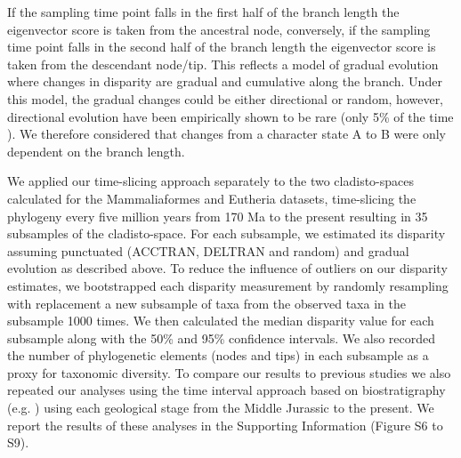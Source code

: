 \documentclass[10pt,letterpaper]{article}
\begin{document}
\begin{enumerate}
    If the sampling time point falls in the first half of the branch length the eigenvector score is taken from the ancestral node, conversely, if the sampling time point falls in the second half of the branch length the eigenvector score is taken from the descendant node/tip.
    This reflects a model of gradual evolution where changes in disparity are gradual and cumulative along the branch.
    Under this model, the gradual changes could be either directional or random, however, directional evolution have been empirically shown to be rare (only 5\% of the time \cite{Hunt20112007}).
    We therefore considered that changes from a character state A to B were only dependent on the branch length.
\end{enumerate}
We applied our time-slicing approach separately to the two cladisto-spaces calculated for the Mammaliaformes and Eutheria datasets, time-slicing the phylogeny every five million years from 170 Ma to the present resulting in 35 subsamples of the cladisto-space.
For each subsample, we estimated its disparity assuming punctuated (ACCTRAN, DELTRAN and random) and gradual evolution as described above.
To reduce the influence of outliers on our disparity estimates, we bootstrapped each disparity measurement by randomly resampling with replacement a new subsample of taxa from the observed taxa in the subsample 1000 times.
We then calculated the median disparity value for each subsample along with the 50\% and 95\% confidence intervals.
We also recorded the number of phylogenetic elements (nodes and tips) in each subsample as a proxy for taxonomic diversity.
To compare our results to previous studies we also repeated our analyses using the time interval approach based on biostratigraphy (e.g. \cite{cisneros2010,prentice2011,Hughes20082013,bentonmodels2014}) using each geological stage from the Middle Jurassic to the present.
We report the results of these analyses in the Supporting Information (Figure S6 to S9).

\end{document}
